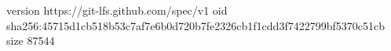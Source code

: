 version https://git-lfs.github.com/spec/v1
oid sha256:45715d1cb518b53c7af7e6b0d720b7fe2326cb1f1cdd3f7422799bf5370c51cb
size 87544
